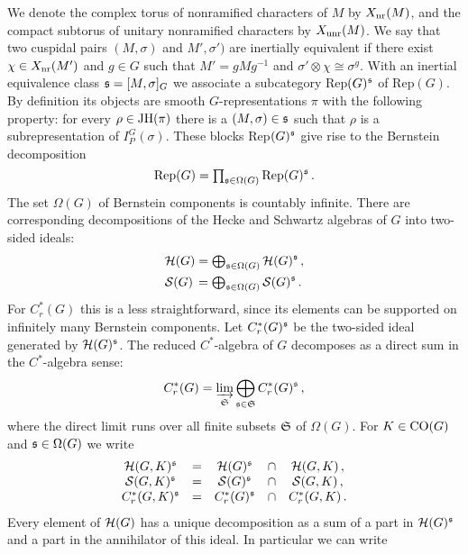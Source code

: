 We denote the complex torus of nonramified characters of $M$ by
$X_{\mathrm{nr}} (M)$, and the compact subtorus of unitary nonramified
characters by $X_{\mathrm{unr}} (M)$. We say that two cuspidal pairs
$(M,\sigma )$ and $M' ,\sigma' )$ are inertially equivalent if
there exist $\chi \in X_{\mathrm{nr}} (M')$ and $g \in G$ such that $M' = g
M g^{-1}$ and $\sigma' \otimes \chi \cong \sigma^g$. With an
inertial equivalence class $\mathfrak s = [M,\sigma ]_G$ we associate a
subcategory Rep$ (G)^{\mathfrak s}$ of Rep$ (G)$. By definition its
objects are smooth $G$-representations $\pi$ with the following
property: for every $\rho \in \mathrm{JH} (\pi)$ there
is a $(M,\sigma ) \in \mathfrak s$ such that $\rho$ is a
subrepresentation of $I_P^G (\sigma )$. These blocks Rep$ (G)^{\mathfrak
s}$ give rise to the Bernstein decomposition \cite[Proposition 2.10]{BeDe}
\[
\mathrm{Rep} (G) = {\textstyle \prod_{\mathfrak s \in \Omega (G)} } \, \mathrm{Rep} (G)^{\mathfrak s} \,.
\]
The set $\Omega (G)$ of Bernstein components is countably infinite. 
There are corresponding decompositions of the Hecke and Schwartz 
algebras of $G$ into two-sided ideals:
\begin{align}
\label{eq:2.3} & \mathcal H (G) = {\textstyle \bigoplus_{\mathfrak s \in \Omega (G)} }
\, \mathcal H (G)^{\mathfrak s} \,, \\
\label{eq:2.4} & \mathcal S (G) \, = {\textstyle \bigoplus_{\mathfrak s \in \Omega (G)} }
\, \mathcal S (G)^{\mathfrak s} \,.
\end{align}
For $C_r^* (G)$ this is a less straightforward, since its elements can be
supported on infinitely many Bernstein components. Let $C_r^* (G)^{\mathfrak s}$ 
be the two-sided ideal generated by $\mathcal H (G)^{\mathfrak s}$. The reduced 
$C^*$-algebra of $G$ decomposes as a direct sum in the $C^*$-algebra sense:
\begin{equation}\label{eq:2.13}
C_r^* (G) = \varinjlim_{\mathfrak S} \bigoplus_{\mathfrak s \in \mathfrak S} C_r^* (G)^{\mathfrak s} \,,
\end{equation}
where the direct limit runs over all finite subsets $\mathfrak S$ of $\Omega (G)$.
For $K \in \mathrm{CO}(G)$ and $\mathfrak s \in \Omega (G)$ we write
\[
\begin{array}{ccccc}
\mathcal H (G,K)^{\mathfrak s} & = & \mathcal H (G)^{\mathfrak s} & \cap & \mathcal H (G,K) \,, \\
\mathcal S (G,K)^{\mathfrak s} & = & \mathcal S (G)^{\mathfrak s} & \cap & \mathcal S (G,K) \,, \\
C_r^* (G,K)^{\mathfrak s} & = & C_r^* (G)^{\mathfrak s} & \cap & C_r^* (G,K) \,.
\end{array}
\]
Every element of $\mathcal H (G)$ has a unique decomposition as a sum
of a part in $\mathcal H (G)^{\mathfrak s}$ and a part in the annihilator of
this ideal. In particular we can write
